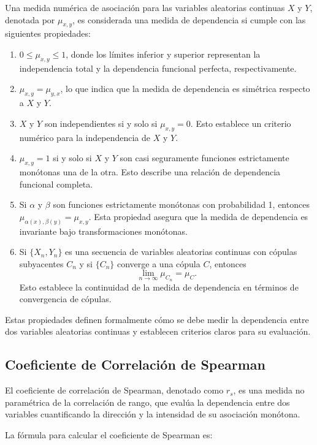 \documentclass{article}
\begin{document}
Una medida numérica de asociación para las variables aleatorias continuas $X$ y $Y$, denotada por $\mu_{x,y}$, es considerada una medida de dependencia si cumple con las siguientes propiedades:

\begin{enumerate}
    \item $0 \leq \mu_{x,y} \leq 1$, donde los límites inferior y superior representan la independencia total y la dependencia funcional perfecta, respectivamente.
    \item $\mu_{x,y} = \mu_{y,x}$, lo que indica que la medida de dependencia es simétrica respecto a $X$ y $Y$.
    \item $X$ y $Y$ son independientes si y solo si $\mu_{x,y} = 0$. Esto establece un criterio numérico para la independencia de $X$ y $Y$.
    \item $\mu_{x,y} = 1$ si y solo si $X$ y $Y$ son casi seguramente funciones estrictamente monótonas una de la otra. Esto describe una relación de dependencia funcional completa.
    \item Si $\alpha$ y $\beta$ son funciones estrictamente monótonas con probabilidad 1, entonces $\mu_{\alpha(x), \beta(y)} = \mu_{x,y}$. Esta propiedad asegura que la medida de dependencia es invariante bajo transformaciones monótonas.
    \item Si $\{X_n,Y_n\}$ es una secuencia de variables aleatorias continuas con cópulas subyacentes $C_n$ y si $\{C_n\}$ converge a una cópula $C$, entonces
          \[\lim_{n \to \infty} \mu_{C_n} = \mu_C.\]
          Esto establece la continuidad de la medida de dependencia en términos de convergencia de cópulas.
\end{enumerate}

Estas propiedades definen formalmente cómo se debe medir la dependencia entre dos variables aleatorias continuas y establecen criterios claros para su evaluación.

\subsection{Coeficiente de Correlación de Spearman}

El coeficiente de correlación de Spearman, denotado como $r_s$, es una medida no paramétrica de la correlación de rango, que evalúa la dependencia entre dos variables cuantificando la dirección y la intensidad de su asociación monótona.

La fórmula para calcular el coeficiente de Spearman es:
\end{document}
